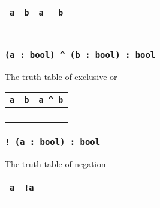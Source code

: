 \begin{table}[H]
	\begin{tabular}{|c|c|c|}
		\hline
		\texttt{a} & \texttt{b} & \texttt{a ~ b} \\ \hline
		\false{} & \false{} & \true{}  \\ \hline
		\false{} & \true{}  & \false{} \\ \hline
		\true{}  & \false{} & \false{} \\ \hline
		\true{}  & \true{}  & \true{}  \\ \hline
	\end{tabular}
\end{table}

\subsubsection{\texttt{(a : bool) ^ (b : bool) : bool}}

\noindent The truth table of exclusive or —

\begin{table}[H]
	\begin{tabular}{|c|c|c|}
		\hline
		\texttt{a} & \texttt{b} & \texttt{a ^ b} \\ \hline
		\false{} & \false{} & \false{} \\ \hline
		\false{} & \true{}  & \true{}  \\ \hline
		\true{}  & \false{} & \true{}  \\ \hline
		\true{}  & \true{}  & \false{} \\ \hline
	\end{tabular}
\end{table}

\subsubsection{\texttt{! (a : bool) : bool}}

\noindent The truth table of negation —

\begin{table}[H]
	\begin{tabular}{|c|c|}
		\hline
		\texttt{a} & \texttt{!a} \\ \hline
		\false{} &  \true{} \\ \hline
		\true{}  & \false{} \\ \hline
	\end{tabular}
\end{table}

